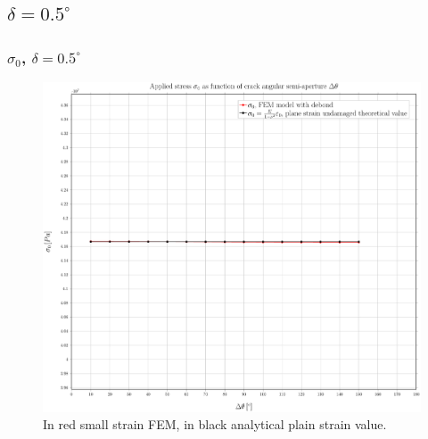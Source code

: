 \documentclass[first,firstsupp,lastsupp,handout,last,hyperref,table]{ETHclass}
\begin{document}


\subsection{$\delta=0.5^{\circ}$}

\begin{frame}
\frametitle{\small $\sigma_{0}$, $\delta=0.5^{\circ}$}
\vspace{-0.5cm}
\centering
\captionsetup[figure]{font=scriptsize,labelfont=scriptsize}
\begin{figure}[!h]
\centering
\includegraphics[height=0.7\textheight]{2017-07-10_AbqRunSummary_SmallStrainD05_sigma-inf_Summary.pdf}
  \caption{\scriptsize In red small strain FEM, in black analytical plain strain value.}
  \label{fig:res1}
\end{figure}
\end{frame}
\end{document}
